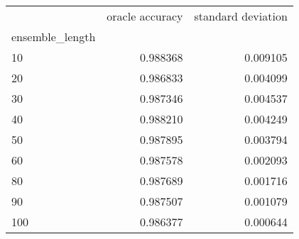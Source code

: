 \begin{tabular}{lrr}
\toprule
{} &  oracle accuracy &  standard deviation \\
ensemble\_length &                  &                     \\
\midrule
10              &         0.988368 &            0.009105 \\
20              &         0.986833 &            0.004099 \\
30              &         0.987346 &            0.004537 \\
40              &         0.988210 &            0.004249 \\
50              &         0.987895 &            0.003794 \\
60              &         0.987578 &            0.002093 \\
80              &         0.987689 &            0.001716 \\
90              &         0.987507 &            0.001079 \\
100             &         0.986377 &            0.000644 \\
\bottomrule
\end{tabular}
